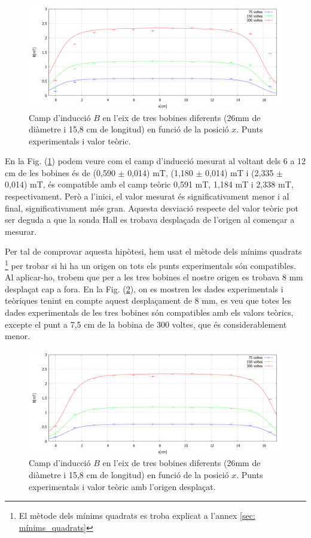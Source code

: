 \documentclass[11pt]{article}
\numberwithin{equation}{section}
\numberwithin{figure}{section}
\numberwithin{table}{section}
\begin{document}
\begin{figure}[H]
    \centering
    \includegraphics[width=0.75\linewidth]{Bobines 2,3,4.PNG}
    \caption{Camp d'inducció $B$ en l'eix de tres bobines diferents (26mm de diàmetre i 15,8 cm de longitud) en funció de la posició $x$. Punts experimentals i valor teòric.}
    \label{fig: BvsX_26mm}
\end{figure}

En la Fig. (\ref{fig: BvsX_26mm}) podem veure com el camp d'inducció mesurat al voltant dels 6 a 12 cm de les bobines és de (0,590 $\pm$ 0,014) mT, (1,180 $\pm$ 0,014) mT i (2,335 $\pm$ 0,014) mT, és compatible amb el camp teòric 0,591 mT, 1,184 mT i 2,338 mT, respectivament. Però a l'inici, el valor mesurat és significativament menor i al final, significativament més gran. Aquesta desviació respecte del valor teòric pot ser deguda a que la sonda Hall es trobava desplaçada de l'origen al començar a mesurar.

Per tal de comprovar aquesta hipòtesi, hem usat el mètode dels mínims quadrats \footnote{El mètode dels mínims quadrats es troba explicat a l'annex \ref{sec: mínims_quadrats}} per trobar si hi ha un origen on tots els punts experimentals són compatibles. Al aplicar-ho, trobem que per a les tres bobines el nostre origen es trobava 8 mm desplaçat cap a fora. En la Fig. (\ref{fig: Bvsx_26mm}), on es mostren les dades experimentals i teòriques tenint en compte aquest desplaçament de 8 mm, es veu que totes les dades experimentals de les tres bobines són compatibles amb els valors teòrics, excepte el punt a 7,5 cm de la bobina de 300 voltes, que és considerablement menor.

\begin{figure}[H]
    \centering
    \includegraphics[width=0.75\linewidth]{Bobines 2,3,4 shift 8mm.PNG}
    \caption{Camp d'inducció $B$ en l'eix de tres bobines diferents (26mm de diàmetre i 15,8 cm de longitud) en funció de la posició $x$. Punts experimentals i valor teòric amb l'origen desplaçat.}
    \label{fig: Bvsx_26mm}
\end{figure}
\end{document}
